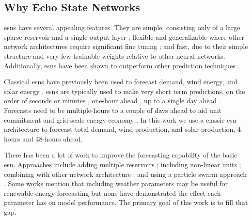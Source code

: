 \subsection{Why Echo State Networks}
\glspl{esn} have several appealing features. They are simple, consisting only
of a large sparse reservoir and a single output layer
\cite{lukosevicius_practical_2012}; flexible and generalizable
where other network architectures require significant fine tuning
\cite{noauthor_deterministic_2019}; and fast, due to their simple structure and
very few trainable weights relative to other neural networks. Additionally,
\glspl{esn} have been shown to outperform other prediction techniques
\cite{jayawardene_comparison_2014,jayawardene_comparison_2015,shi_energy_2016,chitsazan_wind_2019, hu_forecasting_2020}.

Classical \glspl{esn} have previously been used to forecast demand, wind energy, and solar energy \cite{deihimi_application_2012,jayawardene_comparison_2015,hu_forecasting_2020}.
\glspl{esn} are typically used to make very short term predictions, on the
order of seconds or minutes
\cite{chen_novel_2019,wang_echo_2019,chitsazan_wind_2019}, one-hour ahead
\cite{shi_energy_2016}, up to a single day ahead
\cite{deihimi_application_2012}. Forecasts need to be multiple-hours to a
couple of days ahead to aid unit commitment and grid-scale energy economy
\cite{wang_quantifying_2016,mc_garrigle_quantifying_2015,brancucci_martinez-anido_value_2016}. In this work we use a classic \gls{esn} architecture to
forecast total demand, wind production, and solar production, 4-hours and 48-hours ahead.

There has been a lot of work to improve the forecasting capability of
the basic \gls{esn}. Approaches include adding multiple reservoirs
\cite{hu_forecasting_2020,gallicchio_deep_2019,yao_novel_2019,li_multi-reservoir_2020}; including non-linear units \cite{holzmann_echo_2008, chitsazan_wind_2019}; combining with other network architecture
\cite{chen_novel_2019, lopez_wind_2018}; and using a particle swarm approach \cite{chouikhi_pso-based_2017,wang_echo_2019}. Some works mention that
including weather parameters may be useful for renewable energy forecasting
\cite{li_echo_2019,chitsazan_wind_2019} but none have demonstrated the effect
each parameter has on model performance. The primary goal of this work
is to fill that gap.


